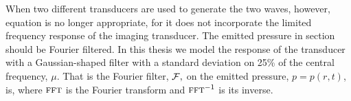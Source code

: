 When two different transducers are used to generate the two waves, however,
equation  is no longer appropriate,
for it does not incorporate the 
limited frequency response of the imaging transducer.
The emitted pressure in  section should be Fourier filtered.
In this thesis we model the response of the transducer with a 
Gaussian-shaped filter with a standard deviation on 25\% of the central frequency, $\mu$.
That is the Fourier filter, ${\cal F},$ on the emitted pressure, $p = p(r,t)$, is,
where $\textsc{fft}$ is the Fourier transform  and $\textsc{fft}^{-1}$ is its inverse.




